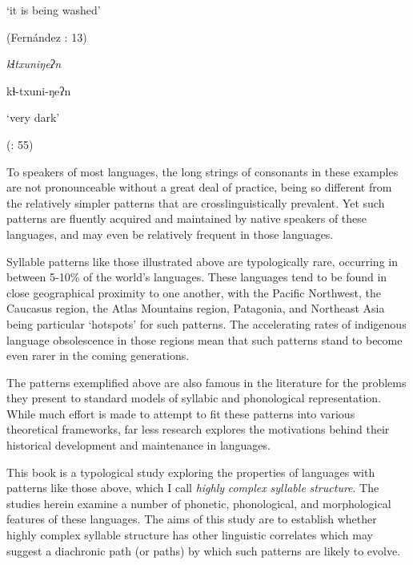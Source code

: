 \glt ‘it is being washed’

(Fernández \citealt{GarayHernández2006}: 13)

\z

\ea\label{ex:(1.5)}

\textit{kɬtxuniŋeʔn}

kɬ-txuni-ŋeʔn

\glt ‘very dark’

(\citealt{GeorgVolodin1999}: 55)

\z

To speakers of most languages, the long strings of consonants in these examples are not pronounceable without a great deal of practice, being so different from the relatively simpler patterns that are crosslinguistically prevalent. Yet such patterns are fluently acquired and maintained by native speakers of these languages, and may even be relatively frequent in those languages.

  Syllable patterns like those illustrated above are typologically rare, occurring in between 5-10\% of the world’s languages. These languages tend to be found in close geographical proximity to one another, with the Pacific Northwest, the Caucasus region, the Atlas Mountains region, Patagonia, and Northeast Asia being particular ‘hotspots’ for such patterns. The accelerating rates of indigenous language obsolescence in those regions mean that such patterns stand to become even rarer in the coming generations.

  The patterns exemplified above are also famous in the literature for the problems they present to standard models of syllabic and phonological representation. While much effort is made to attempt to fit these patterns into various theoretical frameworks, far less research explores the motivations behind their historical development and maintenance in languages.

  This book is a typological study exploring the properties of languages with patterns like those above, which I call \textit{highly} \textit{complex} \textit{syllable} \textit{structure}. The studies herein examine a number of phonetic, phonological, and morphological features of these languages. The aims of this study are to establish whether highly complex syllable structure has other linguistic correlates which may suggest a diachronic path (or paths) by which such patterns are likely to evolve.

